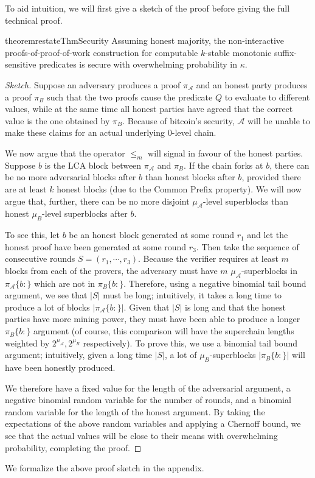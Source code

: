 To aid intuition, we will first give a sketch of the proof before giving the
full technical proof.

\begin{restatable}[Security]{theorem}{restateThmSecurity}
    \label{thm.security}
    Assuming honest majority, the non-interactive proofs-of-proof-of-work
    construction for computable $k$-stable monotonic suffix-sensitive predicates
    is secure with overwhelming probability in $\kappa$.
\end{restatable}
\begin{proof}[Sketch]
Suppose an adversary produces a proof $\pi_\mathcal{A}$ and an honest
party produces a proof $\pi_B$ such that the two proofs cause the predicate $Q$
to evaluate to different values, while at the same time all honest parties have
agreed that the correct value is the one obtained by $\pi_B$. Because of
bitcoin's security, $\mathcal{A}$ will be unable to make these claims for an
actual underlying 0-level chain.

We now argue that the operator $\leq_m$ will
signal in favour of the honest parties.
Suppose $b$ is the LCA block between $\pi_\mathcal{A}$ and $\pi_B$. If the chain
forks at $b$, there can be no more adversarial blocks after $b$ than honest
blocks after $b$, provided there are at least $k$ honest blocks (due to the
Common Prefix property). We will now argue that, further, there can be no more
disjoint $\mu_\mathcal{A}$-level superblocks than honest $\mu_B$-level
superblocks after $b$.

To see this, let $b$ be an honest block generated at some round $r_1$ and let
the honest proof have been generated at some round $r_3$. Then take the sequence
of consecutive rounds $S = (r_1, \cdots, r_3)$. Because the verifier requires at
least $m$ blocks from each of the provers, the adversary must have $m$
$\mu_\mathcal{A}$-superblocks in $\pi_\mathcal{A}\{b:\}$ which are not in
$\pi_B\{b:\}$. Therefore, using a negative binomial tail bound argument, we see
that $|S|$ must be long; intuitively, it takes a long time to produce a lot of
blocks $|\pi_\mathcal{A}\{b:\}|$. Given that $|S|$ is long and that the honest
parties have more mining power, they must have been able to produce a longer
$\pi_B\{b:\}$ argument (of course, this comparison will have the superchain
lengths weighted by $2^{\mu_\mathcal{A}}, 2^{\mu_B}$ respectively). To prove
this, we use a binomial tail bound argument; intuitively, given a long time
$|S|$, a lot of $\mu_B$-superblocks $|\pi_B\{b:\}|$ will have been honestly
produced.

We therefore have a fixed value for the length of the adversarial argument, a
negative binomial random variable for the number of rounds, and a binomial
random variable for the length of the honest argument. By taking the
expectations of the above random variables and applying a Chernoff bound, we see
that the actual values will be close to their means with overwhelming
probability, completing the proof.
\Qed
\end{proof}

We formalize the above proof sketch in the appendix.
